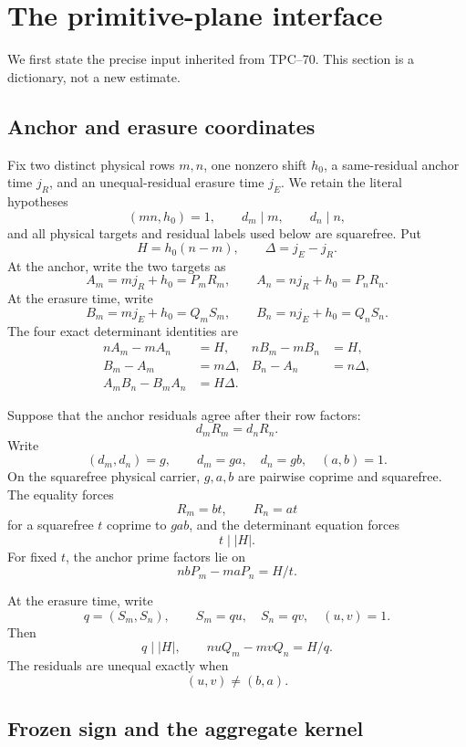 \section{The primitive-plane interface}
\label{sec:primitive-interface}

We first state the precise input inherited from TPC--70.  This section is a
dictionary, not a new estimate.

\subsection{Anchor and erasure coordinates}

Fix two distinct physical rows \(m,n\), one nonzero shift \(h_0\), a
same-residual anchor time \(j_R\), and an unequal-residual erasure time
\(j_E\).  We retain the literal hypotheses
\[
 (mn,h_0)=1,\qquad d_m\mid m,\qquad d_n\mid n,
\]
and all physical targets and residual labels used below are squarefree.
Put
\[
 H=h_0(n-m),
 \qquad
 \Delta=j_E-j_R.
\]
At the anchor, write the two targets as
\[
 A_m=mj_R+h_0=P_mR_m,
 \qquad
 A_n=nj_R+h_0=P_nR_n.
\]
At the erasure time, write
\[
 B_m=mj_E+h_0=Q_mS_m,
 \qquad
 B_n=nj_E+h_0=Q_nS_n.
\]
The four exact determinant identities are
\begin{align}
 nA_m-mA_n&=H,
 &
 nB_m-mB_n&=H,
\label{eq:two-determinants}\\
 B_m-A_m&=m\Delta,
 &
 B_n-A_n&=n\Delta,
\label{eq:vertical-differences}\\
 A_mB_n-B_mA_n&=H\Delta.
\label{eq:four-corner-determinant}
\end{align}

Suppose that the anchor residuals agree after their row factors:
\[
 d_mR_m=d_nR_n.
\]
Write
\[
 (d_m,d_n)=g,
 \qquad
 d_m=ga,\quad d_n=gb,\quad(a,b)=1.
\]
On the squarefree physical carrier, \(g,a,b\) are pairwise coprime and
squarefree.  The equality forces
\[
 R_m=bt,\qquad R_n=at
\]
for a squarefree \(t\) coprime to \(gab\), and the determinant equation
forces
\[
 t\mid |H|.
\]
For fixed \(t\), the anchor prime factors lie on
\[
 nbP_m-maP_n=H/t.
\]

At the erasure time, write
\[
 q=(S_m,S_n),
 \qquad
 S_m=qu,\quad S_n=qv,\quad(u,v)=1.
\]
Then
\[
 q\mid |H|,
 \qquad
 nuQ_m-mvQ_n=H/q.
\]
The residuals are unequal exactly when
\[
 (u,v)\ne(b,a).
\]

\subsection{Frozen sign and the aggregate kernel}

